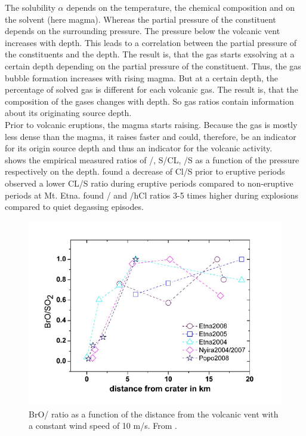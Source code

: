 \documentclass  [
  paper    = a4,
  BCOR     = 10mm,
  twoside,
  fontsize = 12pt,
  fleqn,
  toc      = bibnumbered,
  toc      = listofnumbered,
  numbers  = noendperiod,
  headings = normal,
  listof   = leveldown,
  version  = 3.03
]                                       {scrreprt}
\begin{document}
The solubility $\alpha$ depends on the temperature, the chemical composition and on the solvent (here magma). Whereas the partial pressure of the constituent depends on the surrounding pressure. The pressure below the volcanic vent increases with depth. This leads to a correlation between the partial pressure of the constituents and the depth.
The result is, that the gas starts exsolving at a certain depth depending on the partial pressure of the constituent. Thus, the gas bubble formation increases with rising magma. But at a certain depth, the percentage of solved gas is different for each volcanic gas. The result is, that the composition of the gases changes with depth. So gas ratios contain information about its originating source depth.\\
Prior to volcanic eruptions, the magma starts raising. Because the gas is mostly less dense than the magma, it raises faster and could, therefore, be an indicator for its origin source depth and thus an indicator for the volcanic activity.\\
 shows the empirical measured ratios of  /, S/CL, /S as a function of the pressure respectively on the depth.
%
\citet{noguchi1963prediction} found a decrease of Cl/S prior to eruptive periods
%
\citet{pennisi1998variations} observed a lower CL/S ratio during eruptive periods compared to non-eruptive periods at Mt. Etna.
%
\citet{burton2007magmatic}  found / and /hCl ratios 3-5 times higher during explosions  compared to quiet degassing episodes.
%
\begin{figure}
	\centering
	\includegraphics[width=0.7\linewidth]{Bilder/rat_diff}
	\caption{BrO/ ratio as a function of the distance from the volcanic vent with a constant wind speed of 10 m/s. From \citet{lubcke2014optical}.}
	\label{fig:ratdiff}
\end{figure}    
\end{document}
